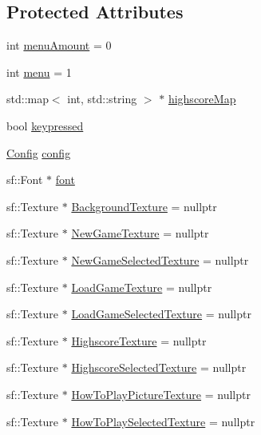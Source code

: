\subsection*{Protected Attributes}
\begin{DoxyCompactItemize}
\item 
int \hyperlink{classStateMainMenu_afa0c8a2d24b6724e68c6f53d7d23e454}{menu\+Amount} = 0
\item 
int \hyperlink{classStateMainMenu_ad717957c78811629a2a495ee98dbe0b9}{menu} = 1
\item 
std\+::map$<$ int, std\+::string $>$ $\ast$ \hyperlink{classStateMainMenu_aab67f5deb21d0baf93a9032e98e16038}{highscore\+Map}
\item 
bool \hyperlink{classStateMainMenu_aadc999cca9e9a3f1e0c0bacaea2a21a8}{keypressed}
\item 
\hyperlink{classConfig}{Config} \hyperlink{classStateMainMenu_ac56c2c42cb67e8e173645e2db04a38b8}{config}
\item 
sf\+::\+Font $\ast$ \hyperlink{classStateMainMenu_a2b8538a5a0e8c8e9b54f454d45426263}{font}
\item 
sf\+::\+Texture $\ast$ \hyperlink{classStateMainMenu_a2f42ec4ca75ae671b65aa9176d2ff63f}{Background\+Texture} = nullptr
\item 
sf\+::\+Texture $\ast$ \hyperlink{classStateMainMenu_a8c54545853bf8f34ca224ff4030016dd}{New\+Game\+Texture} = nullptr
\item 
sf\+::\+Texture $\ast$ \hyperlink{classStateMainMenu_aa6bcd3d4dd129313a0b0c53868bb8334}{New\+Game\+Selected\+Texture} = nullptr
\item 
sf\+::\+Texture $\ast$ \hyperlink{classStateMainMenu_af12831c95e41fc915f025903e1299bc3}{Load\+Game\+Texture} = nullptr
\item 
sf\+::\+Texture $\ast$ \hyperlink{classStateMainMenu_a47c8756a24cb3fbbeb17402d573754c8}{Load\+Game\+Selected\+Texture} = nullptr
\item 
sf\+::\+Texture $\ast$ \hyperlink{classStateMainMenu_ae1057cba0cec32e03cb8c0defc7bcc0b}{Highscore\+Texture} = nullptr
\item 
sf\+::\+Texture $\ast$ \hyperlink{classStateMainMenu_a8302a7a3167e113b25aec8ea80997e87}{Highscore\+Selected\+Texture} = nullptr
\item 
sf\+::\+Texture $\ast$ \hyperlink{classStateMainMenu_a0e729c72932f87ffc6690f4ca3190672}{How\+To\+Play\+Picture\+Texture} = nullptr
\item 
sf\+::\+Texture $\ast$ \hyperlink{classStateMainMenu_afe9186d897d4dd4cf786e1496ef66ed1}{How\+To\+Play\+Selected\+Texture} = nullptr

\end{DoxyCompactItemize}
